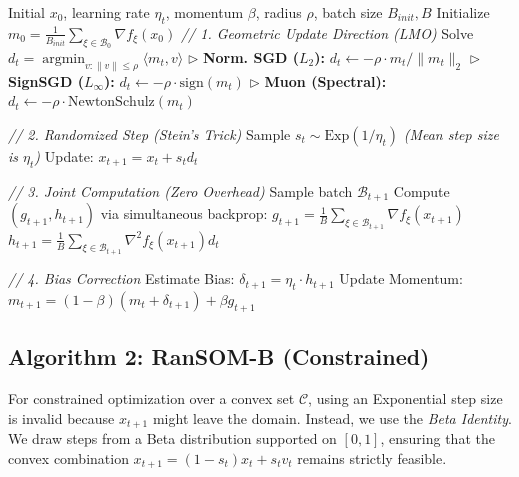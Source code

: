 \documentclass{article}
\theoremstyle{plain}
\theoremstyle{definition}
\theoremstyle{remark}
\DeclareMathOperator{\argmin}{argmin}
\begin{document}
\begin{algorithm}[tb]
   \caption{RanSOM-E: Exponential-Distributed Second-Order Momentum}
   \label{alg:expsom}
\begin{algorithmic}[1]
    Initial $x_0$, learning rate $\eta_t$, momentum $\beta$, radius $\rho$, batch size $B_{init},B$
   \STATE Initialize $m_0 = \frac{1}{B_{init}} \sum_{\xi \in \mathcal{B}_0} \nabla f_{\xi}(x_0)$
   \STATE \textit{// 1. Geometric Update Direction (LMO)}
   \STATE Solve $d_t = \argmin_{v : \|v\| \le \rho} \langle m_t, v \rangle$
   \STATE \quad $\triangleright$ \textbf{Norm. SGD ($L_2$):} $d_t \leftarrow -\rho \cdot m_t / \|m_t\|_2$
   \STATE \quad $\triangleright$ \textbf{SignSGD ($L_\infty$):} $d_t \leftarrow -\rho \cdot \text{sign}(m_t)$
   \STATE \quad $\triangleright$ \textbf{Muon (Spectral):} $d_t \leftarrow -\rho \cdot \text{NewtonSchulz}(m_t)$
   
   \STATE \textit{// 2. Randomized Step (Stein's Trick)}
   \STATE Sample $s_t \sim \mathrm{Exp}(1/\eta_t)$ \quad \textit{(Mean step size is $\eta_t$)}
   \STATE Update: $x_{t+1} = x_t + s_t d_t$
   
   \STATE \textit{// 3. Joint Computation (Zero Overhead)}
   \STATE Sample batch $\mathcal{B}_{t+1}$
   \STATE Compute $(g_{t+1}, h_{t+1})$ via simultaneous backprop:
   \STATE \quad $g_{t+1} = \frac{1}{B} \sum_{\xi \in \mathcal{B}_{t+1}} \nabla f_{\xi}(x_{t+1})$
   \STATE \quad $h_{t+1} = \frac{1}{B} \sum_{\xi \in \mathcal{B}_{t+1}} \nabla^2 f_{\xi}(x_{t+1}) d_t$
   
   \STATE \textit{// 4. Bias Correction}
   \STATE Estimate Bias: $\delta_{t+1} = \eta_t \cdot h_{t+1}$ 
   \STATE Update Momentum: $m_{t+1} = (1-\beta)(m_t + \delta_{t+1}) + \beta g_{t+1}$
   \ENDFOR
\end{algorithmic}
\end{algorithm}
\subsection{Algorithm 2: RanSOM-B (Constrained)}
For constrained optimization over a convex set $\mathcal{C}$, using an Exponential step size is invalid because $x_{t+1}$ might leave the domain. Instead, we use the \textit{Beta Identity}. We draw steps from a Beta distribution supported on $[0, 1]$, ensuring that the convex combination $x_{t+1} = (1-s_t)x_t + s_t v_t$ remains strictly feasible.
\end{document}
